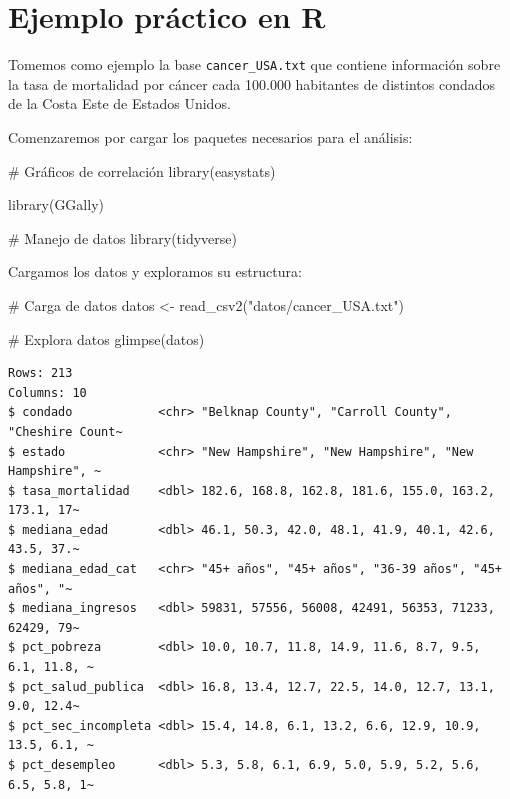 \documentclass[
  spanish,
  a4paper,
]{scrbook}
\newenvironment{Shaded}{\begin{snugshade}}{\end{snugshade}}
\newcommand{\CommentTok}[1]{\textcolor[rgb]{0.37,0.37,0.37}{#1}}
\newcommand{\FunctionTok}[1]{\textcolor[rgb]{0.28,0.35,0.67}{#1}}
\newcommand{\NormalTok}[1]{\textcolor[rgb]{0.00,0.23,0.31}{#1}}
\newcommand{\OtherTok}[1]{\textcolor[rgb]{0.00,0.23,0.31}{#1}}
\newcommand{\StringTok}[1]{\textcolor[rgb]{0.13,0.47,0.30}{#1}}
\begin{document}
\section{Ejemplo práctico en R}\label{ejemplo-pruxe1ctico-en-r-4}

Tomemos como ejemplo la base \texttt{cancer\_USA.txt} que contiene
información sobre la tasa de mortalidad por cáncer cada 100.000
habitantes de distintos condados de la Costa Este de Estados Unidos.

Comenzaremos por cargar los paquetes necesarios para el análisis:

\begin{Shaded}
\begin{Highlighting}[]
\CommentTok{\# Gráficos de correlación}
\FunctionTok{library}\NormalTok{(easystats)}

\FunctionTok{library}\NormalTok{(GGally)}

\CommentTok{\# Manejo de datos}
\FunctionTok{library}\NormalTok{(tidyverse)}
\end{Highlighting}
\end{Shaded}

Cargamos los datos y exploramos su estructura:

\begin{Shaded}
\begin{Highlighting}[]
\CommentTok{\# Carga de datos}
\NormalTok{datos }\OtherTok{\textless{}{-}} \FunctionTok{read\_csv2}\NormalTok{(}\StringTok{"datos/cancer\_USA.txt"}\NormalTok{)}

\CommentTok{\# Explora datos}
\FunctionTok{glimpse}\NormalTok{(datos)}
\end{Highlighting}
\end{Shaded}

\begin{verbatim}
Rows: 213
Columns: 10
$ condado            <chr> "Belknap County", "Carroll County", "Cheshire Count~
$ estado             <chr> "New Hampshire", "New Hampshire", "New Hampshire", ~
$ tasa_mortalidad    <dbl> 182.6, 168.8, 162.8, 181.6, 155.0, 163.2, 173.1, 17~
$ mediana_edad       <dbl> 46.1, 50.3, 42.0, 48.1, 41.9, 40.1, 42.6, 43.5, 37.~
$ mediana_edad_cat   <chr> "45+ años", "45+ años", "36-39 años", "45+ años", "~
$ mediana_ingresos   <dbl> 59831, 57556, 56008, 42491, 56353, 71233, 62429, 79~
$ pct_pobreza        <dbl> 10.0, 10.7, 11.8, 14.9, 11.6, 8.7, 9.5, 6.1, 11.8, ~
$ pct_salud_publica  <dbl> 16.8, 13.4, 12.7, 22.5, 14.0, 12.7, 13.1, 9.0, 12.4~
$ pct_sec_incompleta <dbl> 15.4, 14.8, 6.1, 13.2, 6.6, 12.9, 10.9, 13.5, 6.1, ~
$ pct_desempleo      <dbl> 5.3, 5.8, 6.1, 6.9, 5.0, 5.9, 5.2, 5.6, 6.5, 5.8, 1~
\end{verbatim}
\end{document}
